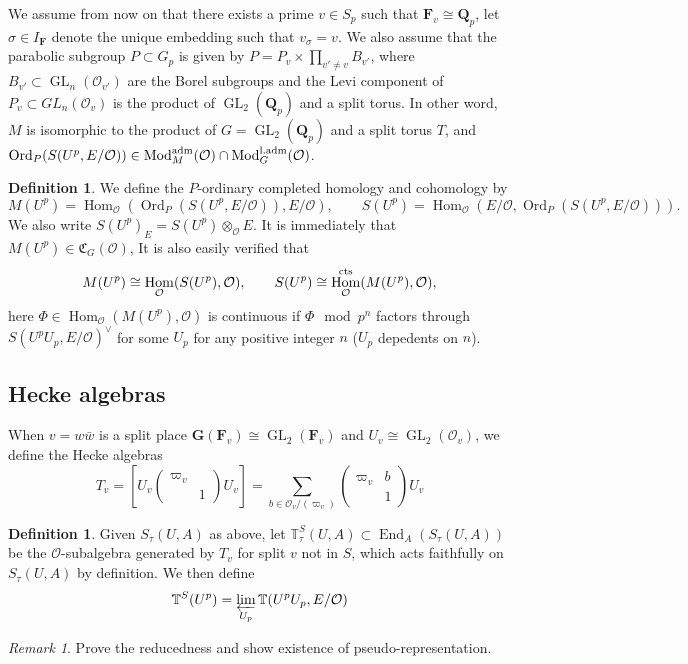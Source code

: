 \documentclass[leqno]{amsart}
\newcommand{\smat}[1]{\left( \begin{smallmatrix} #1 \end{smallmatrix} \right)}
\newcommand{\TT}{\mathbb{T}} %
\newcommand{\GG}{\mathbf G}
\newcommand{\aMod}{\textnormal{Mod}^{\textnormal{adm}}}
\newcommand{\laMod}{\textnormal{Mod}^{\textnormal{l.adm}}}
\newcommand{\fC}{\mathfrak C}
\DeclareMathOperator{\Ord}{Ord}
\newcommand{\cts}{\textnormal{cts}}
\DeclareMathOperator{\GL}{GL}
\newcommand{\Q}{{\mathbf{Q}}}
\newcommand{\Qp}{\mathbf{Q}_p}
\newcommand{\F}{{\mathbf{F}}} %
\newcommand{\oo}{\mathcal{O}} %
\DeclareMathOperator{\End}{End}
\DeclareMathOperator{\Hom}{Hom}
\theoremstyle{definition}
\newtheorem{defn}[thm]{Definition}
\theoremstyle{remark}
\newtheorem{rem}[thm]{Remark}
\begin{document}
We assume from now on that 
there exists a prime $v\in S_p$
such that  $\F_v\cong \Qp$,
let  $\sigma\in I_\F$
denote the unique embedding such that  $v_\sigma=v$.
We also assume that 
the parabolic subgroup $P\subset G_p$ is given by 
$P=P_v\times\prod_{v'\neq v}B_{v'}$,
where $B_{v'}\subset \GL_n(\oo_{v'})$
are the Borel subgroups
and the Levi component of $P_v\subset GL_n(\oo_v)$
is the product of $\GL_2(\Q_p)$ and a split torus.
In other word, $M$ is isomorphic to the product  
of  $G=\GL_2(\Qp)$ and a split torus  $T$,
and  $\Ord_P(S(U^p,E/\oo))\in \aMod_M(\oo)\cap \laMod_{G}(\oo)$.
\begin{defn}
	We define the $P$-ordinary completed homology and cohomology by
	\begin{equation*}
		M(U^p)=\Hom_\oo(\Ord_P(S(U^p,E/\oo)),E/\oo),\qquad
		S(U^p)=\Hom_\oo(E/\oo, \Ord_P(S(U^p,E/\oo))).
	\end{equation*}
	We also write $S(U^p)_E=S(U^p)\otimes_\oo E$.
	It is immediately that 
	$M(U^p)\in \fC_{G}(\oo)$,
	It is also easily verified that 
	\[
		M(U^p)\cong \Hom_\oo(S(U^p),\oo),\qquad
		S(U^p)\cong \Hom_\oo^{\cts}(M(U^p),\oo),
	\]
	here $\Phi\in \Hom_\oo(M(U^p),\oo)$ 
	is continuous if 
	$\Phi \mod p^n$ factors through
	$S(U^pU_p,E/\oo)^\vee$ for some $U_p$
	for any positive integer $n$
	($U_p$ depedents on  $n$).
\end{defn}




\subsection{Hecke algebras}

When $v=w\bar{w}$ is a split place
$\GG(\F_v)\cong \GL_2(\F_v)$ and 
$U_v\cong \GL_2(\oo_v)$, we define the Hecke algebras
\[
	T_v=[U_v\smat{\varpi_v&\\&1}U_v]=
	\sum_{b\in \oo_v/(\varpi_v)}\smat{\varpi_v&b\\&1}U_v
\]
\begin{defn}
	Given $S_{\tau}(U,A)$ as above, 
	let $\TT^S_{\tau}(U,A)\subset \End_A(S_{\tau}(U,A))$
	be the $\oo$-subalgebra generated by  $T_v$
	for  split $v$ not in  $S$,
	which acts faithfully on $S_{\tau}(U,A)$
	by definition. 
	We then define 
	\[
		\TT^S(U^p)=\varprojlim_{U_p}
		\TT(U^pU_p, E/\oo)
	\]
\end{defn}

\begin{rem}
	Prove the reducedness and show existence of 
	pseudo-representation.
	\cite[Prop 2.27]{ger}
\end{rem}
\end{document}

